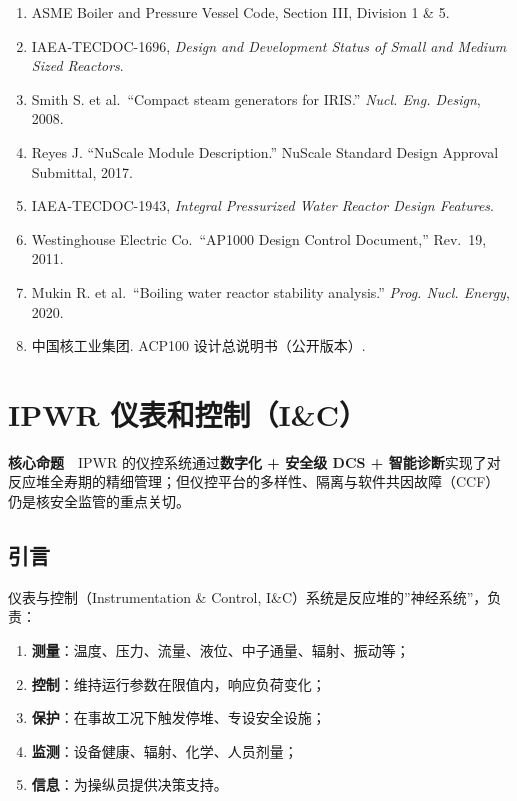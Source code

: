 \documentclass[
  UTF8,
  scheme=plain,
  fontsize=10pt,
  openany
]{ctexbook}
\begin{document}
\begin{enumerate}
\def\labelenumi{\arabic{enumi}.}
\tightlist
\item
  ASME Boiler and Pressure Vessel Code, Section III, Division 1 \& 5.
\item
  IAEA-TECDOC-1696, \emph{Design and Development Status of Small and
  Medium Sized Reactors}.
\item
  Smith S. et al.~``Compact steam generators for IRIS.'' \emph{Nucl.
  Eng. Design}, 2008.
\item
  Reyes J. ``NuScale Module Description.'' NuScale Standard Design
  Approval Submittal, 2017.
\item
  IAEA-TECDOC-1943, \emph{Integral Pressurized Water Reactor Design
  Features}.
\item
  Westinghouse Electric Co.~``AP1000 Design Control Document,'' Rev.~19,
  2011.
\item
  Mukin R. et al.~``Boiling water reactor stability analysis.''
  \emph{Prog. Nucl. Energy}, 2020.
\item
  中国核工业集团. ACP100 设计总说明书（公开版本）.
\end{enumerate}

\cleardoublepage

\chapter{IPWR
仪表和控制（I\&C）}\label{ipwr-ux4eeaux8868ux548cux63a7ux5236ic}

\begin{epigraph}

\textbf{核心命题}　IPWR 的仪控系统通过\textbf{数字化 + 安全级 DCS +
智能诊断}实现了对反应堆全寿期的精细管理；但仪控平台的多样性、隔离与软件共因故障（CCF）仍是核安全监管的重点关切。

\end{epigraph}

\section{引言}\label{ux5f15ux8a00-5}

仪表与控制（Instrumentation \& Control,
I\&C）系统是反应堆的''神经系统''，负责：

\begin{enumerate}
\def\labelenumi{\arabic{enumi}.}
\tightlist
\item
  \textbf{测量}：温度、压力、流量、液位、中子通量、辐射、振动等；
\item
  \textbf{控制}：维持运行参数在限值内，响应负荷变化；
\item
  \textbf{保护}：在事故工况下触发停堆、专设安全设施；
\item
  \textbf{监测}：设备健康、辐射、化学、人员剂量；
\item
  \textbf{信息}：为操纵员提供决策支持。
\end{enumerate}
\end{document}
